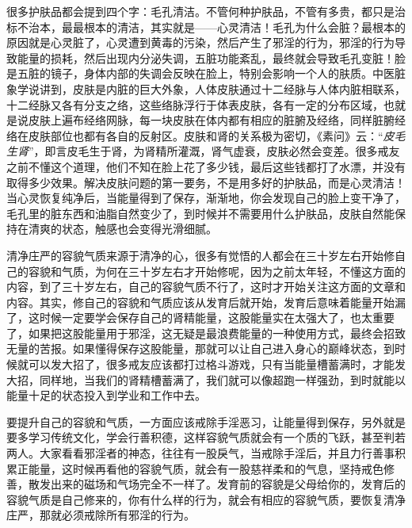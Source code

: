 很多护肤品都会提到四个字：毛孔清洁。不管何种护肤品，不管有多贵，都只是治标不治本，最最根本的清洁，其实就是——心灵清洁！毛孔为什么会脏？最根本的原因就是心灵脏了，心灵遭到黄毒的污染，然后产生了邪淫的行为，邪淫的行为导致能量的损耗，然后出现内分泌失调，五脏功能紊乱，最终就会导致毛孔变脏！脸是五脏的镜子，身体内部的失调会反映在脸上，特别会影响一个人的肤质。中医脏象学说讲到，皮肤是内脏的巨大外象，人体皮肤通过十二经脉与人体内脏相联系，十二经脉又各有分支之络，这些络脉浮行于体表皮肤，各有一定的分布区域，也就是说皮肤上遍布经络网脉，每一块皮肤在体内都有相应的脏腑及经络，同样脏腑经络在皮肤部位也都有各自的反射区。皮肤和肾的关系极为密切，《素问》云：“\textit{皮毛生肾}”，即言皮毛生于肾，为肾精所灌溉，肾气虚衰，皮肤必然会变差。很多戒友之前不懂这个道理，他们不知在脸上花了多少钱，最后这些钱都打了水漂，并没有取得多少效果。解决皮肤问题的第一要务，不是用多好的护肤品，而是心灵清洁！当心灵恢复纯净后，当能量得到了保存，渐渐地，你会发现自己的脸上变干净了，毛孔里的脏东西和油脂自然变少了，到时候并不需要用什么护肤品，皮肤自然能保持在清爽的状态，触感也会变得光滑细腻。

清净庄严的容貌气质来源于清净的心，很多有觉悟的人都会在三十岁左右开始修自己的容貌和气质，为何在三十岁左右才开始修呢，因为之前太年轻，不懂这方面的内容，到了三十岁左右，自己的容貌气质不行了，这时才开始关注这方面的文章和内容。其实，修自己的容貌和气质应该从发育后就开始，发育后意味着能量开始漏了，这时候一定要学会保存自己的肾精能量，这股能量实在太强大了，也太重要了，如果把这股能量用于邪淫，这无疑是最浪费能量的一种使用方式，最终会招致无量的苦报。如果懂得保存这股能量，那就可以让自己进入身心的巅峰状态，到时候就可以发大招了，很多戒友应该都打过格斗游戏，只有当能量槽蓄满时，才能发大招，同样地，当我们的肾精槽蓄满了，我们就可以像超跑一样强劲，到时就能以能量十足的状态投入到学业和工作中去。

要提升自己的容貌和气质，一方面应该戒除手淫恶习，让能量得到保存，另外就是要多学习传统文化，学会行善积德，这样容貌气质就会有一个质的飞跃，甚至判若两人。大家看看邪淫者的神态，往往有一股戾气，当戒除手淫后，并且力行善事积累正能量，这时候再看他的容貌气质，就会有一股慈祥柔和的气息，坚持戒色修善，散发出来的磁场和气场完全不一样了。发育前的容貌是父母给你的，发育后的容貌气质是自己修来的，你有什么样的行为，就会有相应的容貌气质，要恢复清净庄严，那就必须戒除所有邪淫的行为。

